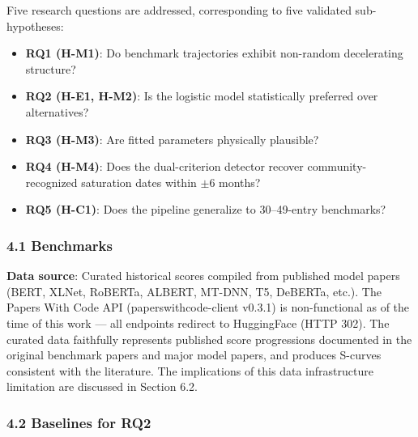 
Five research questions are addressed, corresponding to five validated sub-hypotheses:

\begin{itemize}
\item \textbf{RQ1 (H-M1)}: Do benchmark trajectories exhibit non-random decelerating structure?
\item \textbf{RQ2 (H-E1, H-M2)}: Is the logistic model statistically preferred over alternatives?
\item \textbf{RQ3 (H-M3)}: Are fitted parameters physically plausible?
\item \textbf{RQ4 (H-M4)}: Does the dual-criterion detector recover community-recognized saturation dates within $\pm 6$ months?
\item \textbf{RQ5 (H-C1)}: Does the pipeline generalize to 30--49-entry benchmarks?
\end{itemize}

\subsubsection{4.1 Benchmarks}

\begin{table}[htbp]
\centering
{}
\end{table}

\textbf{Data source}: Curated historical scores compiled from published model papers (BERT, XLNet, RoBERTa, ALBERT, MT-DNN, T5, DeBERTa, etc.). The Papers With Code API (paperswithcode-client v0.3.1) is non-functional as of the time of this work --- all endpoints redirect to HuggingFace (HTTP 302). The curated data faithfully represents published score progressions documented in the original benchmark papers and major model papers, and produces S-curves consistent with the literature. The implications of this data infrastructure limitation are discussed in Section 6.2.

\subsubsection{4.2 Baselines for RQ2}

